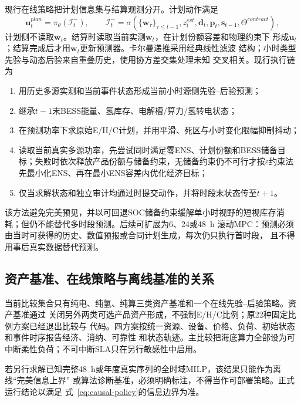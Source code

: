 现行在线策略把计划信息集与结算观测分开。计划动作满足
\begin{equation}
\bm u_t^{plan}=\pi_\theta(\mathcal I_t^-),\qquad
\mathcal I_t^-=\sigma\!\left(
\{\bm w_\tau\}_{\tau\le t-1},z_t^{evt},\bm d_t,\bm p_t,
\bm s_{t-1},\Theta^{contract}\right),
\label{eq:causal-planning-policy}
\end{equation}
计划侧不读取$\bm w_t$。结算时读取当前实测$\bm w_t$，在计划份额容差和物理约束下
形成$\bm u_t$；结算完成后才用$\bm w_t$更新预测器。卡尔曼递推采用经典线性滤波
结构\cite{kalman1960}；小时类型先验与动态后验来自重叠历史，使用协方差交集处理未知
交叉相关\cite{julier1997ci}。现行执行链为
\begin{enumerate}[label=(\arabic*)]
\item 用历史多源实测和当前事件状态形成当前小时源侧先验--后验预测；
\item 继承$t-1$末BESS能量、氢库存、电解槽/算力/氢转电状态；
\item 在预测功率下求原始E/H/C计划，并用平滑、死区与小时变化限幅抑制抖动；
\item 读取当前真实多源功率，先尝试同时满足零ENS、计划份额和BESS储备目标；失败时依次释放产品份额与储备约束，无储备约束仍不可行才按$\varepsilon$约束法先最小化ENS、再在最小ENS容差内优化经济目标\cite{mavrotas2009}；
\item 仅当求解状态和独立审计均通过时提交动作，并将时段末状态传至$t+1$。
\end{enumerate}
该方法避免完美预见，并以可回退SOC储备约束缓解单小时视野的短视库存消耗；但仍不能替代多时段预测。后续可扩展为6、24或48~h
滚动MPC：预测必须由当时可获得的历史、数值预报或合同计划生成，每次仍只执行首时段，
且不得用事后真实数据替代预测。

\subsection{资产基准、在线策略与离线基准的关系}

当前比较集合只有纯电、纯氢、纯算三类资产基准和一个在线先验--后验策略。资产基准通过
关闭另外两类可选产品资产形成，不强制E/H/C比例；原22种固定比例方案已经退出比较与
代码。四方案按统一资源、设备、价格、负荷、初始状态和事件时序报告经济、消纳、可靠性
和状态轨迹。主比较把海底算力全部设为可中断柔性负荷；不可中断SLA只在另行敏感性中启用。

若另行求解已知完整48~h或年度真实序列的全时域MILP，该结果只能作为离线“完美信息上界”
或算法诊断基准，必须明确标注，不得当作可部署策略。正式运行结论以满足
式~\eqref{eq:causal-policy}的信息边界为准。

